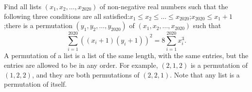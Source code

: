Find all lists $(x_1, x_2, \ldots, x_{2020})$ of non-negative real numbers such that the following three conditions are all satisfied:$x_1 \le x_2 \le \ldots \le x_{2020}$;$x_{2020} \le x_1  + 1$;there is a permutation $(y_1, y_2, \ldots, y_{2020})$ of $(x_1, x_2, \ldots, x_{2020})$ such that $$\sum_{i = 1}^{2020} ((x_i + 1)(y_i + 1))^2 = 8 \sum_{i = 1}^{2020} x_i^3.$$A permutation of a list is a list of the same length, with the same entries, but the entries are allowed to be in any order.  For example, $(2, 1, 2)$ is a permutation of $(1, 2, 2)$,  and they are both permutations of $(2, 2, 1)$.  Note that any list is a permutation of itself.